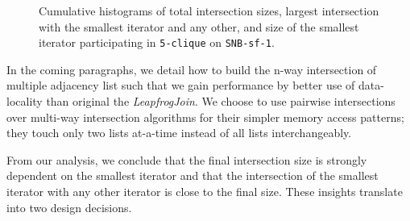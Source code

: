 \begin{figure}[H]
    \centering
    \hfill
    \hfill
    \caption{Cumulative histograms of total intersection sizes, largest intersection with the smallest iterator and any other, and size of the
    smallest iterator participating in \texttt{5-clique} on \texttt{SNB-sf-1}.}
    \label{fig:intersection-workload}
\end{figure}

In the coming paragraphs, we detail how to build the n-way intersection of multiple adjacency list
such that we gain performance by better use of data-locality than original the \textit{LeapfrogJoin}.
We choose to use pairwise intersections over multi-way intersection algorithms for their simpler memory access patterns;
they touch only two lists at-a-time instead of all lists interchangeably.

From our analysis, we conclude that the final intersection size is strongly dependent on the
smallest iterator and that the intersection of the smallest iterator with any other iterator is
close to the final size.
These insights translate into two design decisions.

